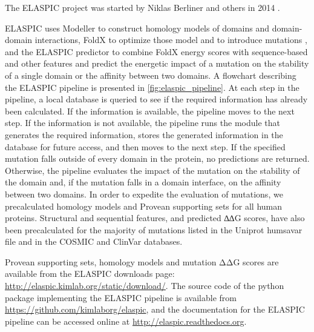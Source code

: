 The ELASPIC project was started by Niklas Berliner and others in 2014 \cite{berliner_combining_2014}.

ELASPIC uses Modeller \cite{webb_comparative_2002} to construct homology models of domains and domain-domain interactions, FoldX to optimize those model and to introduce mutations \cite{schymkowitz_foldx_2005}, and the ELASPIC predictor to combine FoldX energy scores with sequence-based and other features and predict the energetic impact of a mutation on the stability of a single domain or the affinity between two domains. A flowchart describing the ELASPIC pipeline is presented in \ref{fig:elaspic_pipeline}. At each step in the pipeline, a local database is queried to see if the required information has already been calculated. If the information is available, the pipeline moves to the next step. If the information is not available, the pipeline runs the module that generates the required information, stores the generated information in the database for future access, and then moves to the next step. If the specified mutation falls outside of every domain in the protein, no predictions are returned. Otherwise, the pipeline evaluates the impact of the mutation on the stability of the domain and, if the mutation falls in a domain interface, on the affinity between two domains. In order to expedite the evaluation of mutations, we precalculated homology models and Provean supporting sets for all human proteins. Structural and sequential features, and predicted ∆∆G scores, have also been precalculated for the majority of mutations listed in the Uniprot humsavar file \cite{consortium_uniprot:_2015} and in the COSMIC \cite{forbes_cosmic:_2015} and ClinVar \cite{landrum_clinvar:_2016} databases.

Provean supporting sets, homology models and mutation ΔΔG scores are available from the ELASPIC
downloads page: \url{http://elaspic.kimlab.org/static/download/}. The source code of the python package implementing the ELASPIC pipeline is available from \url{https://github.com/kimlaborg/elaspic}, and the documentation for the ELASPIC pipeline can be accessed online at \url{http://elaspic.readthedocs.org}.

